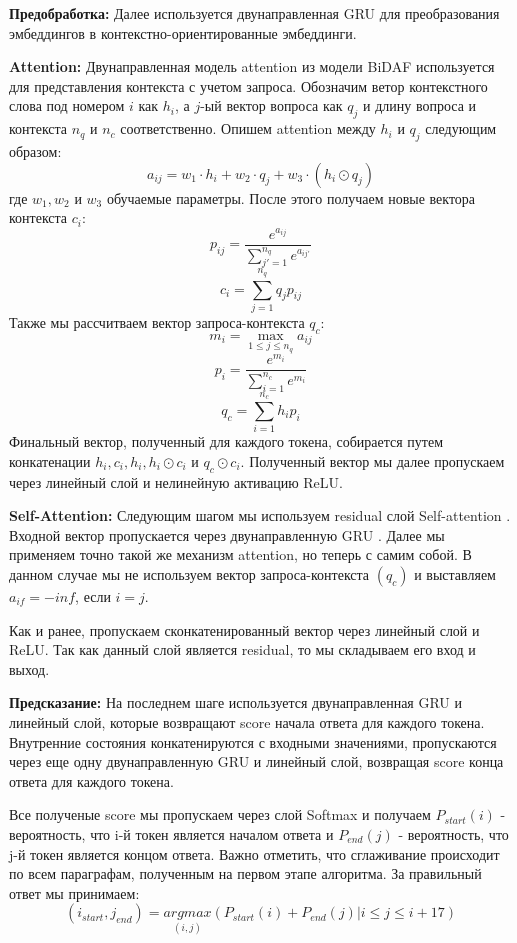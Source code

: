 \documentclass[12pt,twoside]{article}
\begin{document}
 \textbf{Предобработка:}
Далее используется двунаправленная GRU \cite{gru} для преобразования эмбеддингов в контекстно-ориентированные эмбеддинги.


\textbf{Attention:}
Двунаправленная модель attention из модели BiDAF \cite{bidaf} используется для представления контекста с учетом запроса. Обозначим ветор контекстного слова под номером $i$ как $h_i$, а $j$-ый вектор вопроса как $q_j$ и длину вопроса и контекста $n_q$ и $n_c$ соответственно. Опишем attention между $h_i$ и $q_j$ следующим образом:
\[
 a_{ij} = w_1 \cdot h_i + w_2\cdot q_j + w_3\cdot (h_i \odot q_j)
\]
где $w_1, w_2$ и $w_3$ обучаемые параметры. После этого получаем новые вектора контекста $c_i$:
\[
 p_{ij} = \frac{e^{a_{ij}}} {\sum\limits_{j'=1}^{n_q} e^{a_{ij'}}}
\]
\[
 c_i = \sum\limits_{j=1}^{n_q} q_j p_{ij}
\]
Также мы рассчитваем вектор запроса-контекста $q_c$:
\[
 m_i = \max\limits_{1\leqslant j \leqslant n_q} a_{ij}
\]
\[
 p_i = \frac{e^{m_i}}{\sum\limits_{i=1}^{n_c} e^{m_i}}
\]
\[
 q_c = \sum\limits_{i=1}^{n_c} h_i p_i
\]
Финальный вектор, полученный для каждого токена, собирается путем конкатенации $h_i, c_i, h_i, h_i \odot c_i$ и $q_c \odot c_i$. Полученный вектор мы далее пропускаем через линейный слой и нелинейную активацию ReLU.


\textbf{Self-Attention:}
Следующим шагом мы используем residual слой Self-attention \cite{self-att}. Входной вектор пропускается через двунаправленную GRU \cite{gru}. Далее мы применяем точно такой же механизм attention, но теперь с самим собой. В данном случае мы не используем вектор запроса-контекста $(q_c)$ и выставляем $a_{if} = -inf$, если $i=j$.

Как и ранее, пропускаем сконкатенированный вектор через линейный слой и ReLU. Так как данный слой  является residual, то мы складываем его вход и выход.

\textbf{Предсказание:}
На последнем шаге используется двунаправленная GRU \cite{gru} и линейный слой, которые возвращают score начала ответа для каждого токена. Внутренние состояния конкатенируются с входными значениями, пропускаются через еще одну двунаправленную GRU и линейный слой, возвращая score конца ответа для каждого токена. 

Все полученые score мы пропускаем через слой Softmax и получаем $P_{start}(i)$ - вероятность, что i-й токен является началом ответа и $P_{end}(j)$ - вероятность, что j-й токен является концом ответа. Важно отметить, что сглаживание происходит по всем параграфам, полученным на первом этапе алгоритма. За правильный ответ мы принимаем:
\[
 (i_{start}, j_{end}) = \underset{(i, j)}{argmax}( P_{start}(i) + P_{end}(j) | i \leq j \leq i+17)
\]
\end{document}
